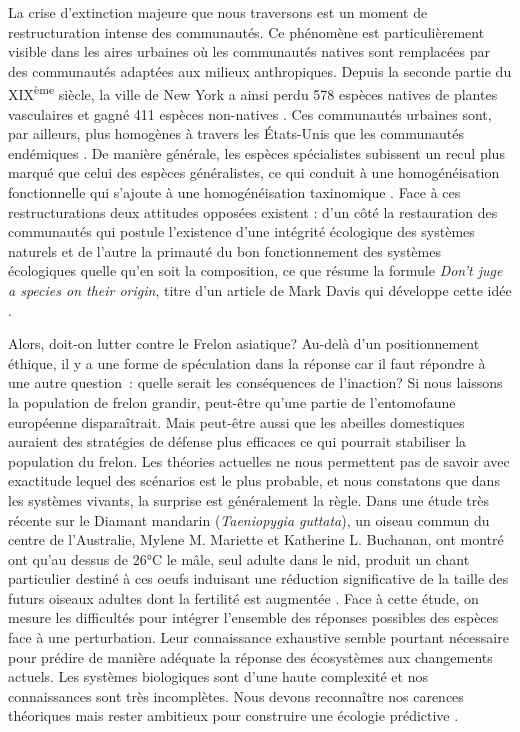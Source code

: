 La crise d'extinction majeure que nous traversons \citep{Thomas2004} est
un moment de restructuration intense des communautés. Ce phénomène est
particulièrement visible dans les aires urbaines où les communautés
natives sont remplacées par des communautés adaptées aux milieux
anthropiques. Depuis la seconde partie du XIX\textsuperscript{ème}
siècle, la ville de New York a ainsi perdu 578 espèces natives de
plantes vasculaires et gagné 411 espèces non-natives
\citep{DeCandido2004}. Ces communautés urbaines sont, par ailleurs, plus
homogènes à travers les États-Unis que les communautés endémiques
\citep{McKinney2006}. De manière générale, les espèces spécialistes
subissent un recul plus marqué que celui des espèces généralistes, ce
qui conduit à une homogénéisation fonctionnelle qui s'ajoute à une
homogénéisation taxinomique \citep{Clavel2011}. Face à ces
restructurations deux attitudes opposées existent : d'un côté la
restauration des communautés qui postule l'existence d'une intégrité
écologique des systèmes naturels \citep{Suding2015} et de l'autre la
primauté du bon fonctionnement des systèmes écologiques quelle qu'en
soit la composition, ce que résume la formule \emph{Don't juge a species
on their origin}, titre d'un article de Mark Davis qui développe cette
idée \citep{Davis2011}.

Alors, doit-on lutter contre le Frelon asiatique? Au-delà d'un
positionnement éthique, il y a une forme de spéculation dans la réponse
car il faut répondre à une autre question~: quelle serait les
conséquences de l'inaction? Si nous laissons la population de frelon
grandir, peut-être qu'une partie de l'entomofaune européenne
disparaîtrait. Mais peut-être aussi que les abeilles domestiques
auraient des stratégies de défense plus efficaces ce qui pourrait
stabiliser la population du frelon. Les théories actuelles ne nous
permettent pas de savoir avec exactitude lequel des scénarios est le
plus probable, et nous constatons que dans les systèmes vivants, la
surprise est généralement la règle. Dans une étude très récente sur le
Diamant mandarin (\emph{Taeniopygia guttata}), un oiseau commun du
centre de l'Australie, Mylene M. Mariette et Katherine L. Buchanan, ont
montré ont qu'au dessus de 26°C le mâle, seul adulte dans le nid,
produit un chant particulier destiné à ces oeufs induisant une réduction
significative de la taille des futurs oiseaux adultes dont la fertilité
est augmentée \citep{Mariette2016}. Face à cette étude, on mesure les
difficultés pour intégrer l'ensemble des réponses possibles des espèces
face à une perturbation. Leur connaissance exhaustive semble pourtant
nécessaire pour prédire de manière adéquate la réponse des écosystèmes
aux changements actuels. Les systèmes biologiques sont d'une haute
complexité et nos connaissances sont très incomplètes. Nous devons
reconnaître nos carences théoriques mais rester ambitieux pour
construire une écologie prédictive \citep{Mouquet2015}.

